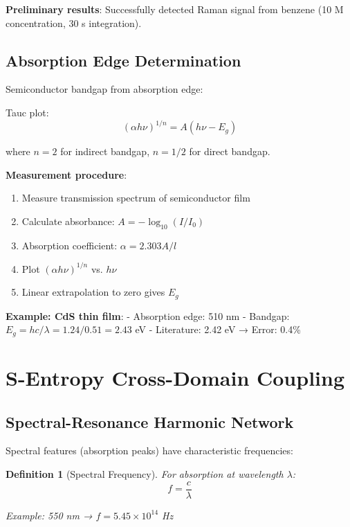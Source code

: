 \documentclass[12pt,a4paper]{article}
\newtheorem{definition}{Definition}
\begin{document}
\textbf{Preliminary results}: Successfully detected Raman signal from benzene (10 M concentration, 30 s integration).

\subsection{Absorption Edge Determination}

Semiconductor bandgap from absorption edge:

Tauc plot:
\begin{equation}
(\alpha h\nu)^{1/n} = A(h\nu - E_g)
\end{equation}

where $n = 2$ for indirect bandgap, $n = 1/2$ for direct bandgap.

\textbf{Measurement procedure}:
\begin{enumerate}
\item Measure transmission spectrum of semiconductor film
\item Calculate absorbance: $A = -\log_{10}(I/I_0)$
\item Absorption coefficient: $\alpha = 2.303 A / l$
\item Plot $(\alpha h\nu)^{1/n}$ vs. $h\nu$
\item Linear extrapolation to zero gives $E_g$
\end{enumerate}

\textbf{Example: CdS thin film}:
- Absorption edge: 510 nm
- Bandgap: $E_g = hc/\lambda = 1.24 / 0.51 = 2.43$ eV
- Literature: 2.42 eV → Error: 0.4\%

\section{S-Entropy Cross-Domain Coupling}

\subsection{Spectral-Resonance Harmonic Network}

Spectral features (absorption peaks) have characteristic frequencies:

\begin{definition}[Spectral Frequency]
For absorption at wavelength $\lambda$:
\begin{equation}
f = \frac{c}{\lambda}
\end{equation}

Example: 550 nm → $f = 5.45 \times 10^{14}$ Hz
\end{definition}
\end{document}
